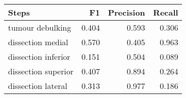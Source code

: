 \begin{tabular}{lrrr}
\toprule
Steps & F1 & Precision & Recall \\
\midrule
tumour debulking & 0.404 & 0.593 & 0.306 \\
dissection medial & 0.570 & 0.405 & 0.963 \\
dissection inferior & 0.151 & 0.504 & 0.089 \\
dissection superior & 0.407 & 0.894 & 0.264 \\
dissection lateral & 0.313 & 0.977 & 0.186 \\
\bottomrule
\end{tabular}
